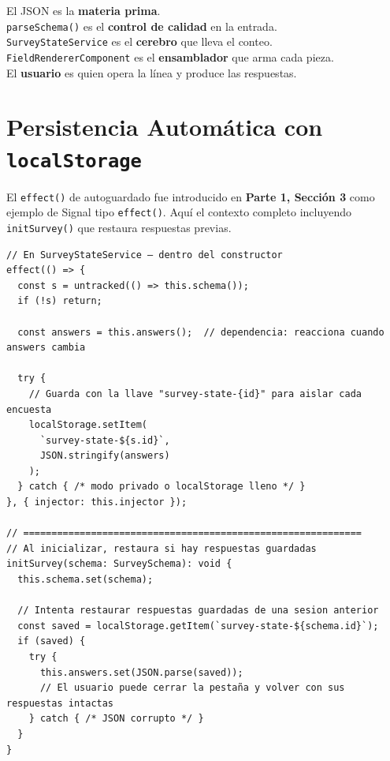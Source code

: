 \documentclass[12pt, a4paper]{article}
\begin{document}
\begin{tcolorbox}[analogia, title={\emoji{factory} \emoji{factory} La Línea de Producción}]
  El JSON es la \textbf{materia prima}.\\
  \texttt{parseSchema()} es el \textbf{control de calidad} en la entrada.\\
  \texttt{SurveyStateService} es el \textbf{cerebro} que lleva el conteo.\\
  \texttt{FieldRendererComponent} es el \textbf{ensamblador} que arma cada pieza.\\
  El \textbf{usuario} es quien opera la línea y produce las respuestas.
\end{tcolorbox}

\section{  Persistencia Automática con \texttt{localStorage}}

El \texttt{effect()} de autoguardado fue introducido en \textbf{Parte 1, Sección 3} como ejemplo de Signal tipo \texttt{effect()}.
Aquí el contexto completo incluyendo \texttt{initSurvey()} que restaura respuestas previas.

\begin{lstlisting}
// En SurveyStateService — dentro del constructor
effect(() => {
  const s = untracked(() => this.schema());
  if (!s) return;

  const answers = this.answers();  // dependencia: reacciona cuando answers cambia

  try {
    // Guarda con la llave "survey-state-{id}" para aislar cada encuesta
    localStorage.setItem(
      `survey-state-${s.id}`,
      JSON.stringify(answers)
    );
  } catch { /* modo privado o localStorage lleno */ }
}, { injector: this.injector });

// ============================================================
// Al inicializar, restaura si hay respuestas guardadas
initSurvey(schema: SurveySchema): void {
  this.schema.set(schema);

  // Intenta restaurar respuestas guardadas de una sesion anterior
  const saved = localStorage.getItem(`survey-state-${schema.id}`);
  if (saved) {
    try {
      this.answers.set(JSON.parse(saved));
      // El usuario puede cerrar la pestaña y volver con sus respuestas intactas
    } catch { /* JSON corrupto */ }
  }
}
\end{lstlisting}
\end{document}
